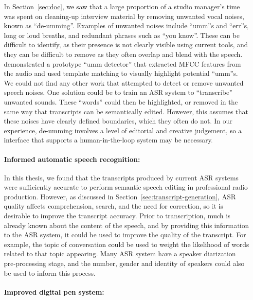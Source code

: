 In Section~\ref{sec:doc}, we saw that a large proportion of a studio manager's time was spent on cleaning-up interview
material by removing unwanted vocal noises, known as ``de-umming''. Examples of unwanted noises include ``umm''s and
``err''s, long or loud breaths, and redundant phrases such as ``you know''.  These can be difficult to identify, as
their presence is not clearly visible using current tools, and they can be difficult to remove as they often overlap
and blend with the speech. \citet{Loviscach2013} demonstrated a prototype ``umm detector'' that extracted MFCC
\citep{Imai1983} features from the audio and used template matching to visually highlight potential ``umm''s. We could
not find any other work that attempted to detect or remove unwanted speech noises.  One solution could be to train an
ASR system to ``transcribe'' unwanted sounds. These ``words'' could then be highlighted, or removed in the same way
that transcripts can be semantically edited.  However, this assumes that these noises have clearly defined boundaries,
which they often do not.  In our experience, de-umming involves a level of editorial and creative judgement, so a
interface that supports a human-in-the-loop system may be necessary.

\paragraph{Informed automatic speech recognition:}

In this thesis, we found that the transcripts produced by current ASR systems were sufficiently accurate to perform
semantic speech editing in professional radio production. However, as discussed in
Section~\ref{sec:transcript-generation}, ASR quality affects comprehension, search, and the need for correction, so it
is desirable to improve the transcript accuracy. Prior to transcription, much is already known about the content of the
speech, and by providing this information to the ASR system, it could be used to improve the quality of the transcript.
For example, the topic of conversation could be used to weight the likelihood of words related to that topic appearing.
Many ASR system have a speaker diarization pre-processing stage, and the number, gender and identity of speakers could
also be used to inform this process.

\paragraph{Improved digital pen system:}


